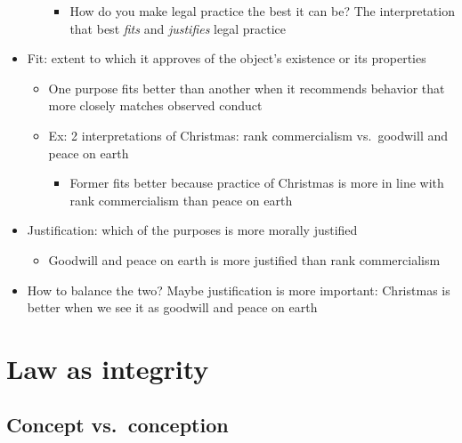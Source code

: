 \begin{itemize}
\begin{itemize}
    \begin{itemize}
    \tightlist
    \item
      How do you make legal practice the best it can be? The
      interpretation that best \emph{fits} and \emph{justifies} legal
      practice
    \end{itemize}
  \end{itemize}
\item
  Fit: extent to which it approves of the object's existence or its
  properties

  \begin{itemize}
  \tightlist
  \item
    One purpose fits better than another when it recommends behavior
    that more closely matches observed conduct
  \item
    Ex: 2 interpretations of Christmas: rank commercialism vs.~goodwill
    and peace on earth

    \begin{itemize}
    \tightlist
    \item
      Former fits better because practice of Christmas is more in line
      with rank commercialism than peace on earth
    \end{itemize}
  \end{itemize}
\item
  Justification: which of the purposes is more morally justified

  \begin{itemize}
  \tightlist
  \item
    Goodwill and peace on earth is more justified than rank
    commercialism
  \end{itemize}
\item
  How to balance the two? Maybe justification is more important:
  Christmas is better when we see it as goodwill and peace on earth
\end{itemize}

\hypertarget{law-as-integrity}{%
\section{Law as integrity}\label{law-as-integrity}}

\hypertarget{concept-vs.-conception}{%
\subsection{Concept vs.~conception}\label{concept-vs.-conception}}

